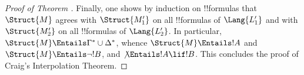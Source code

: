 \documentclass[../../include/open-logic-section]{subfiles}
\begin{document}
\begin{proof}[Proof of Theorem ]
Finally, one shows by induction on !!{formula}s that $\Struct{M}$ agrees
with $\Struct{M'_1}$ on all !!{formula}s of $\Lang{L'_1}$ and with
$\Struct{M'_2}$ on all !!{formula}s of $\Lang{L'_2}$. In particular,
$\Struct{M} \Entails \Gamma^* \cup \Delta^*$, whence $\Struct{M}
\Entails !A$ and $\Struct{M} \Entails \lnot!B$, and
$\not\Entails !A \lif !B$. This concludes the proof of
Craig's Interpolation Theorem.
\end{proof}
\end{document}
